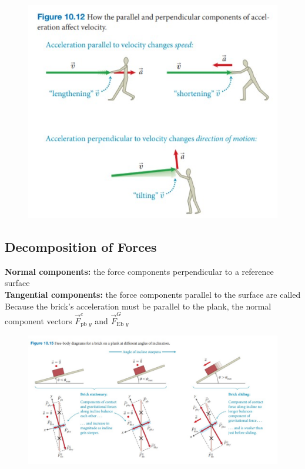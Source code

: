         \begin{figure}[hbt!]
            \centering
            \includegraphics[]{Resources/vec}
        \end{figure}



    \subsection{Decomposition of Forces}


        \textbf{Normal components:} the force components perpendicular to a reference surface \\
        \textbf{Tangential components:} the force components parallel to the surface are called \\

        Because the brick's acceleration must be parallel to the plank, the normal component vectors $\vec{F}^c_{\text{pb }y}$ and $\vec{F}^G_{\text{Eb }y}$

        \begin{figure}[hbt!]
            \centering
            \includegraphics[scale=0.5]{Resources/2D_FBD}
        \end{figure}

